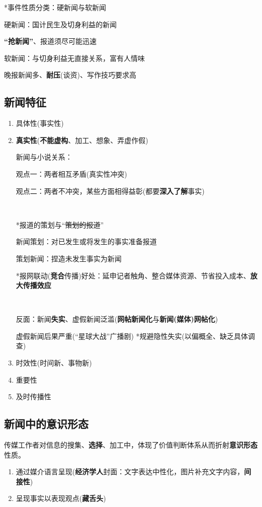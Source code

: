 \documentclass[a4paper,UTF8]{ctexart}
\begin{document}
*事件性质分类：硬新闻与软新闻

硬新闻：国计民生及切身利益的新闻

\textbf{“抢新闻”}、报道须尽可能迅速

软新闻：与切身利益无直接关系，富有人情味

晚报新闻多、\textbf{耐压}(谈资)、写作技巧要求高

\subsection{新闻特征}
\begin{enumerate}
	\item 具体性(事实性)
	\item \textbf{真实性}(\textbf{不能虚构}、加工、想象、弄虚作假)
	
	新闻与小说关系：
	
	观点一：两者相互矛盾(真实性冲突)
	
	观点二：两者不冲突，某些方面相得益彰(都要\textbf{深入了解}事实)
	
	~
	
	*报道的策划与“\sout{策划的报道}”
	
	新闻策划：对已发生或将发生的事实准备报道
	
	策划新闻：捏造未发生事实为新闻
	
	*报网联动(\textbf{竞合}传播)好处：延申记者触角、整合媒体资源、节省投入成本、\textbf{放大传播效应}
	
	~
	
	反面：新闻\textbf{失实}、虚假新闻泛滥(\textbf{网帖新闻化}与\textbf{新闻(媒体)网帖化})
	
	虚假新闻后果严重(“星球大战”广播剧)
	*规避隐性失实(以偏概全、缺乏具体调查)
	
	\item 时效性(时间新、事物新)
	\item 重要性
	\item 及时传播性
\end{enumerate}

\subsection{新闻中的意识形态}
传媒工作者对信息的搜集、\textbf{选择}、加工中，体现了价值判断体系从而折射\textbf{意识形态}性质。

\begin{enumerate}
	\item 通过媒介语言呈现(\textbf{经济学人}封面：文字表达中性化，图片补充文字内容，\textbf{间接性})
	\item 呈现事实以表现观点(\textbf{藏舌头})
\end{enumerate}
\end{document}
